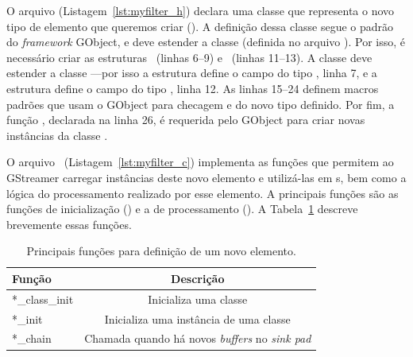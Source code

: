 O arquivo  (Listagem~\ref{lst:myfilter_h}) declara uma classe que
representa o novo tipo de elemento que queremos criar ().  A
definição dessa classe segue o padrão do \emph{framework} GObject, e deve
estender a classe  (definida no arquivo ).  Por
isso, é necessário criar as estruturas ~(linhas 6--9) e
~(linhas 11--13).  A classe  deve estender
a classe ---por isso a estrutura  define o campo
 do tipo , linha 7, e a estrutura
 define o campo  do tipo
, linha 12.  As linhas 15--24 definem macros padrões que
usam o  GObject para checagem e  do novo tipo
definido.  Por fim, a função , declarada na linha 26,
é requerida pelo  GObject para criar novas instâncias da 
classe .



O arquivo ~(Listagem~\ref{lst:myfilter_c}) implementa as funções
que permitem ao GStreamer carregar instâncias deste novo elemento e utilizá-las
em s, bem como a lógica do processamento realizado por esse
elemento.  A principais funções são as funções de inicialização () e
a de processamento (). A Tabela~\ref{tab:funcs} descreve brevemente
essas funções.

\begin{table}
  \centering
  \begin{tabular}{ | l | c |}
    \hline
    Função         & Descrição \\ \hline\hline
    *\_class\_init & Inicializa uma classe \\ \hline
    *\_init        & Inicializa uma instância de uma classe \\ \hline
    *\_chain       & Chamada quando há novos \textit{buffers} no 
                      \textit{sink pad} \\ \hline
  \end{tabular}
  \caption{Principais funções para definição de um novo elemento.}
  \label{tab:funcs}
\end{table}

